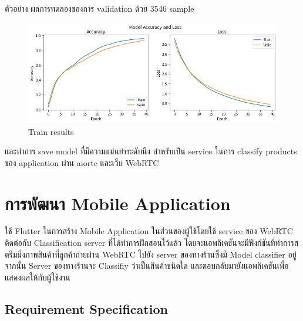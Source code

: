ตัวอย่าง ผลการทดลองของการ validation ด้วย 3546 sample
\begin{figure}[h]
  \begin{center}
  \includegraphics[scale=0.45]{pic/train.png}
  \end{center}
  
  \caption[Train results]{Train results}
  \label{fig:Train results}
  \end{figure}


  และทำการ save model ที่มีความแม่นยำระดับนึง
   สำหรับเป็น service ในการ classify products ของ application ผ่าน aiortc  และเว็บ WebRTC



\newpage

\section{การพัฒนา Mobile Application}
ใช้ Flutter ในการสร้าง Mobile Application ในส่วนของผู้ใช้โดยใช้ service ของ WebRTC ติดต่อกับ Classification server ที่ได้ทำการฝึกสอนไว้แล้ว
โดยจะแอพลิเคชันจะมีฟังก์ชันที่ทำการสตรีมมิ่งภาพสินค้าที่ลูกค้าถ่ายผ่าน WebRTC ไปยัง server ของทางร้านซึ่งมี Model classifier อยู่
จากนั้น Server ของทางร้านจะ Classifiy ว่าเป็นสินค้าชนิดใด และตอบกลับมายังแอพลิเคชันเพื่อแสดงผลให้กับผู้ใช้งาน
\subsection{Requirement Specification}  

